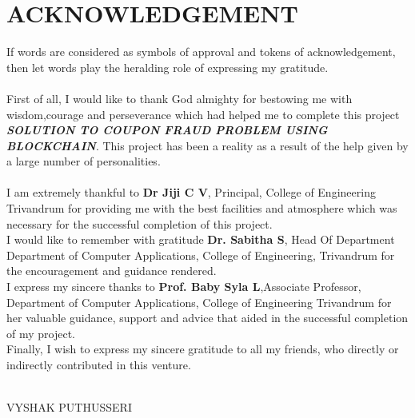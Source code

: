 \chapter*{\rm \large \bf ACKNOWLEDGEMENT}
\vspace{4.0mm}
\setlength{\parindent}{1cm} 


\indent If words are considered as symbols of approval and tokens of
acknowledgement, then let words play the heralding role of expressing my
gratitude.\\ \\
\indent First of all, I would like to thank God almighty for bestowing me with
wisdom,courage and perseverance which had helped me to complete this
project \textbf{\textit{SOLUTION TO COUPON FRAUD PROBLEM USING BLOCKCHAIN}}.
This project has been a reality as a result of the help given by a large
number of personalities.\\ \\
\indent I am extremely thankful to \textbf{Dr Jiji C V}, Principal, College of Engineering Trivandrum for providing me with the best facilities and atmosphere which was necessary for the successful completion of this project.\\ 

\indent I would like to remember with gratitude \textbf{Dr. Sabitha S},
Head Of Department Department of Computer Applications, College of Engineering,
Trivandrum for the encouragement and guidance rendered.\\ 

\indent I express my sincere thanks to \textbf{Prof. Baby Syla L},Associate
Professor, Department of Computer Applications, College of Engineering
Trivandrum for her valuable guidance, support and advice that aided in the
successful completion of my project.\\ 

\indent Finally, I wish to express my sincere gratitude to all my friends,
who directly or indirectly contributed in this venture. \\ \\




\begin{flushright}
VYSHAK PUTHUSSERI\\



\end{flushright}
\newpage
